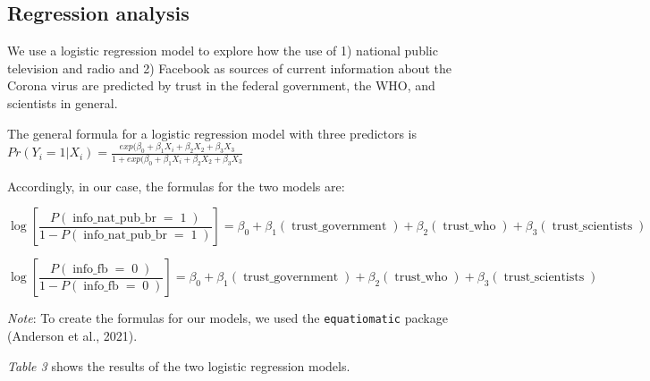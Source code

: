 \documentclass[
]{article}
\begin{document}
\newpage

\hypertarget{regression-analysis}{%
\subsection{Regression analysis}\label{regression-analysis}}

We use a logistic regression model to explore how the use of 1) national
public television and radio and 2) Facebook as sources of current
information about the Corona virus are predicted by trust in the federal
government, the WHO, and scientists in general.

The general formula for a logistic regression model with three
predictors is
\(Pr(Y_i=1|X_i) = {\frac{exp(\beta_0 + \beta_1X_i + \beta_2X_2 + \beta_3X_3}{1 + exp (\beta_0 + \beta_1X_i + \beta_2X_2 + \beta_3X_3}}\)

Accordingly, in our case, the formulas for the two models are:

\begin{equation}
\log\left[ \frac { P( \operatorname{info\_nat\_pub\_br} = \operatorname{1} ) }{ 1 - P( \operatorname{info\_nat\_pub\_br} = \operatorname{1} ) } \right] = \beta_{0} + \beta_{1}(\operatorname{trust\_government}) + \beta_{2}(\operatorname{trust\_who}) + \beta_{3}(\operatorname{trust\_scientists})
\end{equation}

\begin{equation}
\log\left[ \frac { P( \operatorname{info\_fb} = \operatorname{0} ) }{ 1 - P( \operatorname{info\_fb} = \operatorname{0} ) } \right] = \beta_{0} + \beta_{1}(\operatorname{trust\_government}) + \beta_{2}(\operatorname{trust\_who}) + \beta_{3}(\operatorname{trust\_scientists})
\end{equation}

\emph{Note}: To create the formulas for our models, we used the
\texttt{equatiomatic} package (Anderson et al., 2021).

\emph{Table 3} shows the results of the two logistic regression models.
\end{document}
